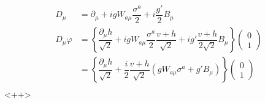 \documentclass[italian,a4paper]{article}
\theoremstyle{definition}
\newcommand{\dimu}{\ensuremath{\partial_{\mu}}}
\newcommand{\Dimu}{\ensuremath{D_{\mu}}}
\begin{document}
\begin{align*}
    \Dimu &= \dimu + i g W_{a\mu}\dfrac{\sigma^a}{2} + i
    \dfrac{g'}{2}B_\mu\\
    \Dimu \varphi &= \left\{ \dfrac{\dimu h}{\sqrt{2}}
    + i g W_{a\mu}\dfrac{\sigma^a}{2}\dfrac{v + h}{\sqrt{2}}
    + i g' \dfrac{v + h}{2 \sqrt{2}} B_\mu \right\}
    \begin{pmatrix}
        0\\
        1
    \end{pmatrix}\\
    &= \left\{ \dfrac{\dimu h}{\sqrt{2}}
    + \dfrac{i}{2}\dfrac{v + h}{\sqrt{2}}(g W_{a\mu}\sigma^a + g' B_\mu) \right\}
    \begin{pmatrix}
        0\\
        1
    \end{pmatrix}\\
\end{align*}<++>
\end{document}
